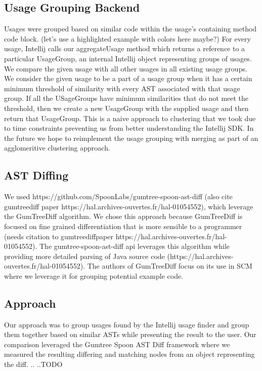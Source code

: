 \documentclass[conference]{IEEEtran}
\begin{document}
\subsection{Usage Grouping Backend} 
Usages were grouped based on similar code within the usage's containing method code block. (let's use a highlighted example with colors here maybe?) For every usage, Intellij calls our aggregateUsage method which returns a reference to a particular UsageGroup, an internal Intellij object representing groups of usages. We compare the given usage with all other usages in all existing usage groups. We consider the given usage to be a part of a usage group when it has a certain minimum threshold of similarity with every AST associated with that usage group. If all the USageGroups have minimum similarities that do not meet the threshold, then we create a new UsageGroup with the supplied usage and then return that UsageGroup. This is a naive approach to clustering that we took due to time constraints preventing us from better understanding the Intellij SDK. In the future we hope to reimplement the usage grouping with merging as part of an agglomeritive clustering approach.

\subsection{AST Diffing}
We used https://github.com/SpoonLabs/gumtree-spoon-ast-diff (also cite gumtreediff paper https://hal.archives-ouvertes.fr/hal-01054552), which leverage the GumTreeDiff algorithm. We chose this approach because GumTreeDiff is focused on fine grained differentiation that is more sensible to a programmer (needs citation to gumtreediffpaper https://hal.archives-ouvertes.fr/hal-01054552). The gumtree-spoon-ast-diff api leverages this algorithm while providing more detailed parsing of Java source code (https://hal.archives-ouvertes.fr/hal-01054552). The authors of GumTreeDiff focus on its use in SCM where we leverage it for grouping potential example code.




\subsection{Approach}
Our approach was to group usages found by the Intellij usage finder and group them together based on similar ASTs while presenting the result to the user. Our comparison leveraged the Gumtree Spoon AST Diff framework where we measured the resulting differing and matching nodes from an object representing the diff. 
 .. ..TODO 
\end{document}
